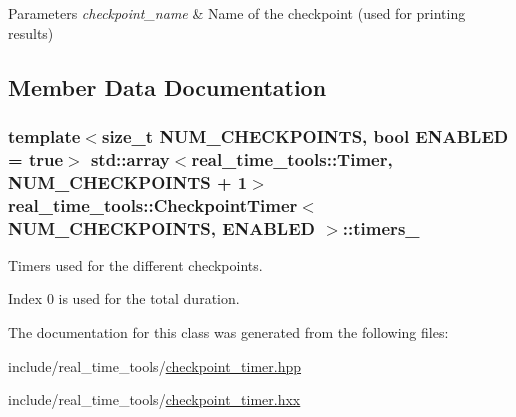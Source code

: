 \begin{DoxyParams}{Parameters}
{\em checkpoint\+\_\+name} & Name of the checkpoint (used for printing results) \\
\hline
\end{DoxyParams}


\subsection{Member Data Documentation}
\subsubsection[{\texorpdfstring{timers\+\_\+}{timers_}}]{\setlength{\rightskip}{0pt plus 5cm}template$<$size\+\_\+t N\+U\+M\+\_\+\+C\+H\+E\+C\+K\+P\+O\+I\+N\+TS, bool E\+N\+A\+B\+L\+ED = true$>$ std\+::array$<${\bf real\+\_\+time\+\_\+tools\+::\+Timer}, N\+U\+M\+\_\+\+C\+H\+E\+C\+K\+P\+O\+I\+N\+TS + 1$>$ {\bf real\+\_\+time\+\_\+tools\+::\+Checkpoint\+Timer}$<$ N\+U\+M\+\_\+\+C\+H\+E\+C\+K\+P\+O\+I\+N\+TS, E\+N\+A\+B\+L\+ED $>$\+::timers\+\_\+\hspace{0.3cm}{\ttfamily [private]}}\hypertarget{classreal__time__tools_1_1CheckpointTimer_a0abbead69aaf780b649f6af01f50cc62}{}\label{classreal__time__tools_1_1CheckpointTimer_a0abbead69aaf780b649f6af01f50cc62}


Timers used for the different checkpoints. 

Index 0 is used for the total duration. 

The documentation for this class was generated from the following files\+:\begin{DoxyCompactItemize}
\item 
include/real\+\_\+time\+\_\+tools/\hyperlink{checkpoint__timer_8hpp}{checkpoint\+\_\+timer.\+hpp}\item 
include/real\+\_\+time\+\_\+tools/\hyperlink{checkpoint__timer_8hxx}{checkpoint\+\_\+timer.\+hxx}\end{DoxyCompactItemize}
